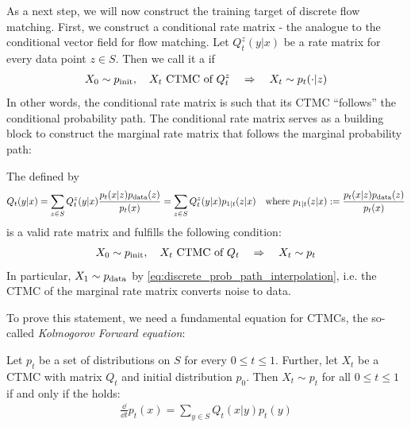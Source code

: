 As a next step, we will now construct the training target of discrete flow matching. First, we construct a conditional rate matrix - the analogue to the conditional vector field for flow matching. Let $Q_t^z(y|x)$ be a rate matrix for every data point $z\in S$. Then we call it a  if 
\begin{align*}
    X_0\sim p_{\rm{init}},\quad  X_t\text{ CTMC of }Q_t^z\quad \Rightarrow \quad X_{t}\sim p_t(\cdot|z)
\end{align*}
In other words, the conditional rate matrix is such that its CTMC ``follows'' the conditional probability path. The conditional rate matrix serves as a building block to construct the marginal rate matrix that follows the marginal probability path:
\begin{theorem}
\label{thm:discrete_marginalization_trick}
The  defined by
\begin{align}
\label{eq:discrete_marginal_rate_matrix}
Q_t(y|x)=\sum\limits_{z\in S}Q_t^z(y|x)\frac{p_t(x|z)p_{\rm{data}}(z)}{p_t(x)}=\sum\limits_{z\in S}Q_t^z(y|x)p_{1|t}(z|x)\quad \text{where }p_{1|t}(z|x):=\frac{p_t(x|z)p_{\rm{data}}(z)}{p_t(x)}
\end{align}
is a valid rate matrix and fulfills the following condition:
\begin{align*}
     X_0\sim p_{\rm{init}},\quad  X_t\text{ CTMC of }Q_t\quad \Rightarrow \quad X_{t}\sim p_t
\end{align*}
In particular, $X_1\sim p_{\rm{data}}$ by \cref{eq:discrete_prob_path_interpolation}, i.e. the CTMC of the marginal rate matrix converts noise to data.
\end{theorem}
To prove this statement, we need a fundamental equation for CTMCs, the so-called \emph{Kolmogorov Forward equation}:
\begin{proposition}
\label{prop:kfe_ctmc}
Let $p_t$ be a set of distributions on $S$ for every $0\leq t\leq 1$. Further, let $X_t$ be a CTMC with matrix $Q_t$ and initial distribution $p_0$. Then $X_t\sim p_t$ for all $0\leq t\leq 1$ if and only if the  holds:
\begin{align*}
    \frac{\dd}{\dd t}p_t(x)=\sum\limits_{y\in S}Q_t(x|y)p_t(y)
\end{align*}
\end{proposition}
